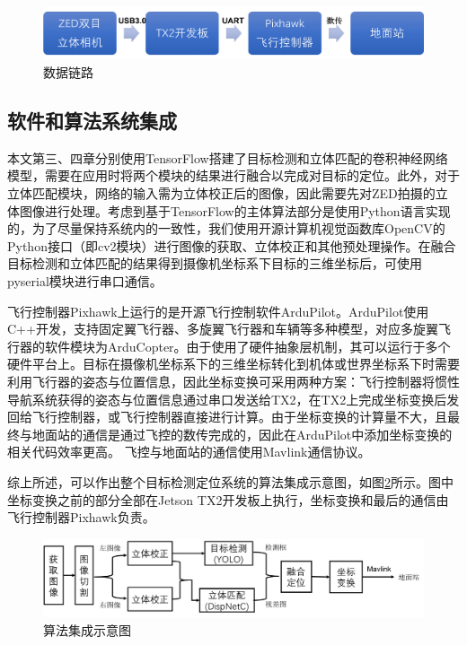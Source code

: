 \begin{figure}[htb] %
	\centering
	\includegraphics[width=6in]{figures/5_平台介绍/数据链路}
	\caption{数据链路}\label{fig:5_1_数据链路}
\end{figure}


\subsection{软件和算法系统集成}
本文第三、四章分别使用TensorFlow搭建了目标检测和立体匹配的卷积神经网络模型，需要在应用时将两个模块的结果进行融合以完成对目标的定位。此外，对于立体匹配模块，网络的输入需为立体校正后的图像，因此需要先对ZED拍摄的立体图像进行处理。考虑到基于TensorFlow的主体算法部分是使用Python语言实现的，为了尽量保持系统内的一致性，我们使用开源计算机视觉函数库OpenCV的Python接口（即cv2模块）进行图像的获取、立体校正和其他预处理操作。在融合目标检测和立体匹配的结果得到摄像机坐标系下目标的三维坐标后，可使用pyserial模块进行串口通信。

飞行控制器Pixhawk上运行的是开源飞行控制软件ArduPilot。ArduPilot使用C++开发，支持固定翼飞行器、多旋翼飞行器和车辆等多种模型，对应多旋翼飞行器的软件模块为ArduCopter。由于使用了硬件抽象层机制，其可以运行于多个硬件平台上。目标在摄像机坐标系下的三维坐标转化到机体或世界坐标系下时需要利用飞行器的姿态与位置信息，因此坐标变换可采用两种方案：飞行控制器将惯性导航系统获得的姿态与位置信息通过串口发送给TX2，在TX2上完成坐标变换后发回给飞行控制器，或飞行控制器直接进行计算。由于坐标变换的计算量不大，且最终与地面站的通信是通过飞控的数传完成的，因此在ArduPilot中添加坐标变换的相关代码效率更高。
飞控与地面站的通信使用Mavlink通信协议。

综上所述，可以作出整个目标检测定位系统的算法集成示意图，如图\ref{fig:5_1_算法集成示意图}所示。图中坐标变换之前的部分全部在Jetson TX2开发板上执行，坐标变换和最后的通信由飞行控制器Pixhawk负责。

\begin{figure}[htb] %
	\centering
	\includegraphics[width=6in]{figures/5_平台介绍/算法集成示意图}
	\caption{算法集成示意图}\label{fig:5_1_算法集成示意图}
\end{figure}

